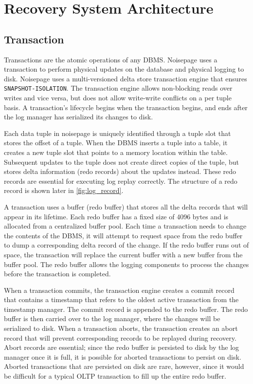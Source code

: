 \documentclass[12pt]{cmuthesis}
\begin{document}
\section{Recovery System Architecture}
\subsection{Transaction}
Transactions are the atomic operations of any DBMS. Noisepage uses a transaction to perform physical updates on the database and physical logging to disk. Noisepage uses a multi-versioned delta store transaction engine that ensures \texttt{SNAPSHOT-ISOLATION}. The transaction engine allows non-blocking reads over writes and vice versa, but does not allow write-write conflicts on a per tuple basis. A transaction's lifecycle begins when the transaction begins, and ends after the log manager has serialized its changes to disk.

Each data tuple in noisepage is uniquely identified through a tuple slot that stores the offset of a tuple. When the DBMS inserts a tuple into a table, it creates a new tuple slot that points to a memory location within the table. Subsequent updates to the tuple does not create direct copies of the tuple, but stores delta information (redo records) about the updates instead. These redo records are essential for executing log replay correctly. The structure of a redo record is shown later in \ref{fig:log_record}.

A transaction uses a buffer (redo buffer) that stores all the delta records that will appear in its lifetime. Each redo buffer has a fixed size of 4096 bytes and is allocated from a centralized buffer pool. Each time a transaction needs to change the contents of the DBMS, it will attempt to request space from the redo buffer to dump a corresponding delta record of the change. If the redo buffer runs out of space, the transaction will replace the current buffer with a new buffer from the buffer pool. The redo buffer allows the logging components to process the changes before the transaction is completed.

When a transaction commits, the transaction engine creates a commit record that contains a timestamp that refers to the oldest active transaction from the timestamp manager. The commit record is appended to the redo buffer. The redo buffer is then carried over to the log manager, where the changes will be serialized to disk. When a transaction aborts, the transaction creates an abort record that will prevent corresponding records to be replayed during recovery. Abort records are essential; since the redo buffer is persisted to disk by the log manager once it is full, it is possible for aborted transactions to persist on disk. Aborted transactions that are persisted on disk are rare, however, since it would be difficult for a typical OLTP transaction to fill up the entire redo buffer.
\end{document}
